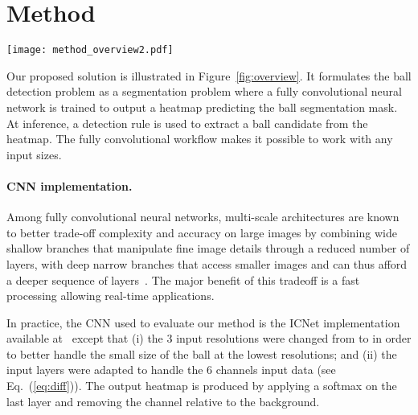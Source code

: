 \documentclass[sigconf, screen]{acmart}
\begin{document}
\section{Method}
\label{sec:model}


\begin{figure*}
    \begin{center}
    \texttt{[image: method\_overview2.pdf]}
    \end{center}
    \vspace{-1em}
    \caption{
    Our detector is based on a segmentation task performed by a fully convolutional network that outputs a heatmap of the ball position. At inference, a detection rule is used to predict the ball location from the heatmap.}
    \label{fig:overview}
\end{figure*}


Our proposed solution is illustrated in Figure~\ref{fig:overview}. It formulates the ball detection problem as a segmentation problem
where a fully convolutional neural network is trained to output a heatmap predicting the ball segmentation mask.
At inference, a detection rule is used to extract a ball candidate from the heatmap.
The fully convolutional workflow makes it possible to work with any input sizes.


\paragraph{CNN implementation.}
Among fully convolutional neural networks, multi-scale architectures are known to better trade-off complexity and accuracy on large images by combining wide shallow branches that manipulate fine image details through a reduced number of layers, with deep narrow branches that access smaller images and can thus afford a deeper sequence of layers~\cite{Yu2018,Mazzini2019,Poudel2019,Zhao2018}. The major benefit of this tradeoff is a fast processing allowing real-time applications.

In practice, the CNN used to evaluate our method is the ICNet implementation available at~\cite{hellochick} except that (i) the 3 input resolutions were changed from {\footnotesize } to {\footnotesize } in order to better handle the small size of the ball at the lowest resolutions; and (ii) the input layers were adapted to handle the 6 channels input data (see Eq.~(\ref{eq:diff})). The output heatmap is produced by applying a softmax on the last layer and removing the channel relative to the background.
\end{document}
